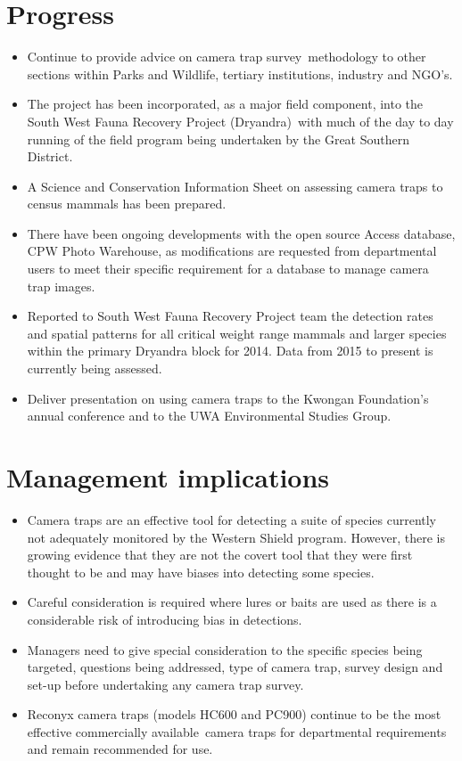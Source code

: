 \documentclass[version=last,
    paper=a4, %
    10pt, %
    usenames,
    dvipsnames,
    oneside, %
    headings=openany, %
    DIV=15 %
]{scrbook}
\begin{document}
\section*{Progress}
\begin{itemize}
\itemsep1pt\parskip0pt
\item
  Continue to provide advice on camera trap survey~methodology to other
  sections within Parks and Wildlife, tertiary institutions, industry
  and NGO's.
\item
  The project has been incorporated, as a major field component, into
  the South West Fauna Recovery Project (Dryandra)~with much of the day
  to day running of the field program being undertaken by the Great
  Southern District.
\item
  A Science and Conservation Information Sheet on assessing camera traps
  to census mammals has been prepared.
\item
  There have been ongoing developments with the open source Access
  database, CPW Photo Warehouse, as modifications are requested from
  departmental users to meet their specific requirement for a database
  to manage camera trap images.
\item
  Reported to South West Fauna Recovery Project team the detection rates
  and spatial patterns for all critical weight range mammals and larger
  species within the primary Dryandra block for 2014. Data from 2015 to
  present is currently being assessed.
\item
  Deliver presentation on using camera traps to the Kwongan Foundation's
  annual conference and to the UWA Environmental Studies Group.
\end{itemize}



\section*{Management implications}
\begin{itemize}
\itemsep1pt\parskip0pt
\item
  Camera traps are an effective tool for detecting a suite of species
  currently not adequately monitored by the Western Shield program.
  However, there is growing evidence that they are not the covert tool
  that they were first thought to be and may have biases into detecting
  some species.~
\item
  Careful consideration is required where lures or baits are used as
  there is a considerable risk of introducing bias in detections.
\item
  Managers need to give special consideration to the specific species
  being targeted, questions being addressed, type of camera trap, survey
  design and set-up before undertaking any camera trap survey.
\item
  Reconyx camera traps (models HC600 and PC900) continue to be the most
  effective commercially available~camera traps for departmental
  requirements and remain recommended for use.
\end{itemize}
\end{document}
